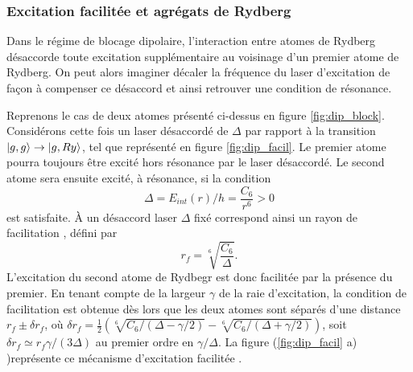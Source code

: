 	\subsubsection*{Excitation facilitée et agrégats de Rydberg}
	
\noindent Dans le régime de blocage dipolaire, l'interaction entre atomes de Rydberg désaccorde toute excitation supplémentaire au voisinage d'un premier atome de Rydberg.
On peut alors imaginer décaler la fréquence du laser d'excitation de façon à compenser ce désaccord et ainsi retrouver une condition de résonance.

Reprenons le cas de deux atomes présenté ci-dessus en figure \eqref{fig:dip_block}.
Considérons cette fois un laser désaccordé de $\Delta$ par rapport à la transition $\ket{g,g} \rightarrow \ket{g,Ry}$, tel que représenté en figure \eqref{fig:dip_facil}.
Le premier atome pourra toujours être excité hors résonance par le laser désaccordé.
Le second atome sera ensuite excité, à résonance, si la condition
\begin{equation}
\label{eq:condition_facil}
\Delta = E_{int}(r)/h = \frac{C_6}{r^6} > 0
\end{equation}
est satisfaite.
\`A un désaccord laser $\Delta$ fixé correspond ainsi un \og rayon de facilitation \fg{}, défini par
\begin{equation}
\label{eq:r_facil}
r_f = \sqrt[6]{\frac{C_6}{\Delta}}.
\end{equation}
L'excitation du second atome de Rydbegr est donc \og facilitée \fg{} par la présence du premier.
En tenant compte de la largeur $\gamma$ de la raie d'excitation, la condition de facilitation est obtenue dès lors que les deux atomes sont séparés d'une distance $r_f \pm \delta r_f$,
où $\delta r_f = \frac{1}{2} \left( \sqrt[6]{C_6/(\Delta-\gamma/2)} - \sqrt[6]{C_6/(\Delta+\gamma/2)} \right)$, soit $\delta r_f \simeq r_f \gamma / (3\Delta)$ au premier ordre en $\gamma / \Delta$.
La figure (\ref{fig:dip_facil} a) )représente ce mécanisme d'\og excitation facilitée \fg{} .
%	

